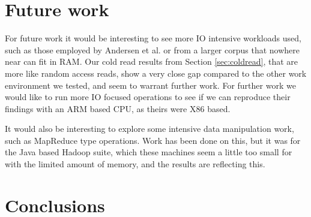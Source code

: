 
\clearpage
\section{Future work}
\label{sec:future}
For future work it would be interesting to see more IO intensive workloads used, such as those employed by Andersen et al.\cite{fawn} or from a larger corpus that nowhere near can fit in RAM.
Our cold read results from Section \ref{sec:coldread}, that are more like random access reads, show a very close gap compared to the other work environment we tested, and seem to warrant further work.
For further work we would like to run more IO focused operations to see if we can reproduce their findings with an ARM based CPU, as theirs were X86 based.

It would also be interesting to explore some intensive data manipulation work, such as MapReduce type operations.
Work has been done on this, but it was for the Java based Hadoop suite, which these machines seem a little too small for with the limited amount of memory, and the results are reflecting this.

\clearpage
\section{Conclusions}
\label{sec:conclusion}
